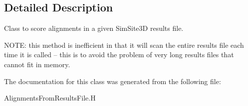 \subsection{Detailed Description}
Class to score alignments in a given Sim\-Site3D results file. 

NOTE: this method is inefficient in that it will scan the entire results file each time it is called -- this is to avoid the problem of very long results files that cannot fit in memory. 



The documentation for this class was generated from the following file:\begin{CompactItemize}
\item 
Alignments\-From\-Results\-File.H\end{CompactItemize}
